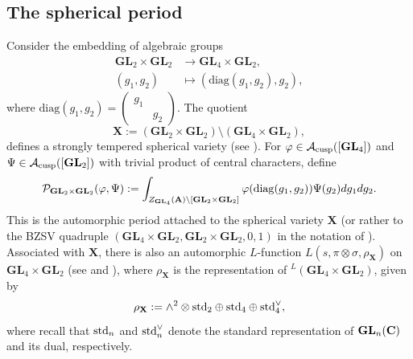 \documentclass[11pt, reqno]{amsart}
\theoremstyle{plain}
\theoremstyle{definition}
\theoremstyle{remark}
\theoremstyle{plain}
\def\C{{\bf C}}
\def\A{{\bf A}}
\def\GL{\mathbf{GL}}
\begin{document}
\subsection{The spherical period}\label{subsec:spherical_period}

Consider the embedding of algebraic groups
\begin{align*}
    \GL_2\times \GL_2&\to \GL_4\times \GL_2,\\
    (g_1, g_2) &\mapsto \left( \mathrm{diag}(g_1,g_2),g_2\right),
\end{align*}
where $\mathrm{diag}(g_1,g_2) = \left(\begin{smallmatrix}
        g_1& \\ &g_2\end{smallmatrix}\right)$. The quotient
\[\mathbf{X} := (\GL_2\times \GL_2)\setminus (\GL_4\times \GL_2),\]
defines a strongly tempered spherical variety (see \cite[Table 1]{Wan:Zhang:Spherical:Periods}). For $\varphi\in \mathcal{A}_{\rm cusp}([\GL_4])$ and $\Psi\in \mathcal{A}_{\rm cusp}([\GL_2])$ with trivial product of central characters, define
\[\mathcal{P}_{\GL_2 \times \GL_2}(\varphi,\Psi):= \int_{Z_{\GL_4}(\A)\backslash [\GL_2\times \GL_2]}\varphi(\mathrm{diag}(g_1,g_2))\Psi(g_2)dg_1dg_2.\]
This is the automorphic period attached to the spherical variety $ \mathbf{X}$ (or rather to the BZSV quadruple $(\GL_4 \times \GL_2, \GL_2\times \GL_2, 0, 1 )$ in the notation of \cite{MWZ}). Associated with $\mathbf{X}$, there is also an automorphic $L$-function $L(s,\pi \otimes \sigma, \rho_\mathbf{X})$ on $\GL_4 \times \GL_2$ (see \cite{sakellaridis2013spherical} and \cite{Wan:Zhang:Spherical:Periods}), where $\rho_{\mathbf{X}}$ is the representation of $^L(\GL_4\times \GL_2)$, given by $$\rho_{\mathbf{X}} := \wedge^2 \otimes {\rm std}_2 \oplus {\rm std}_4 \oplus {\rm std}_4^\vee,$$
where recall that ${\rm std}_n$  and ${\rm std}_n^\vee$ denote the standard representation of $\GL_n(\C)$ and its dual, respectively. 
\end{document}
